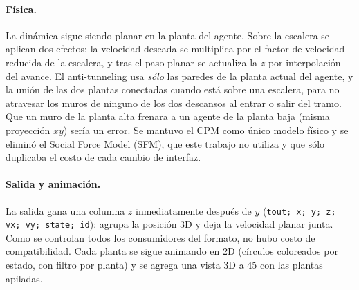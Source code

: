\documentclass[11pt,a4paper]{article}
\begin{document}
\paragraph{Física.}
La dinámica sigue siendo planar en la planta del agente. Sobre la escalera se aplican dos efectos:
la velocidad deseada se multiplica por el factor de velocidad reducida de la escalera, y tras el
paso planar se actualiza la $z$ por interpolación del avance. El anti-tunneling usa \emph{sólo} las
paredes de la planta actual del agente, y la unión de las dos plantas conectadas cuando está sobre
una escalera, para no atravesar los muros de ninguno de los dos descansos al entrar o salir del
tramo. Que un muro de la planta alta frenara a un agente de la planta baja (misma proyección $xy$)
sería un error. Se mantuvo el CPM como único modelo físico y se eliminó el Social Force Model
(SFM), que este trabajo no utiliza y que sólo duplicaba el costo de cada cambio de interfaz.

\paragraph{Salida y animación.}
La salida gana una columna $z$ inmediatamente después de $y$
(\texttt{tout; x; y; z; vx; vy; state; id}): agrupa la posición 3D y deja la velocidad planar
junta. Como se controlan todos los consumidores del formato, no hubo costo de compatibilidad. Cada
planta se sigue animando en 2D (círculos coloreados por estado, con filtro por planta) y se agrega
una vista 3D a 45\textdegree{} con las plantas apiladas.
\end{document}
